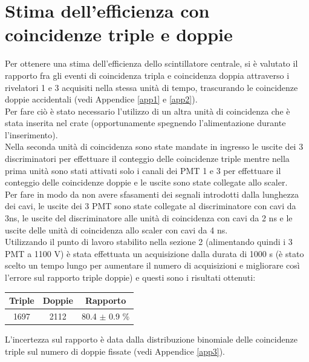 \documentclass[10pt,a4paper]{article}
\begin{document}
\section{Stima dell'efficienza con coincidenze triple e doppie}
Per ottenere una stima dell'efficienza dello scintillatore centrale, si è valutato il rapporto fra gli eventi di coincidenza tripla e coincidenza doppia attraverso i rivelatori 1 e 3 acquisiti nella stessa unità di tempo, trascurando le coincidenze doppie accidentali (vedi Appendice \ref{app1} e \ref{app2}).\\[6pt]
Per fare ciò è stato necessario l'utilizzo di un altra unità di coincidenza che è stata inserita nel crate (opportunamente spegnendo l'alimentazione durante l'inserimento).\\[6pt]
Nella seconda unità di coincidenza sono state mandate in ingresso le uscite dei 3 discriminatori per effettuare il conteggio delle coincidenze triple mentre nella prima unità sono stati attivati solo i canali dei PMT 1 e 3 per effettuare il conteggio delle coincidenze doppie e le uscite sono state collegate allo scaler.\\[6pt]
Per fare in modo da non avere sfasamenti dei segnali introdotti dalla lunghezza dei cavi, le uscite dei 3 PMT sono state collegate al discriminatore con cavi da 3ns, le uscite del discriminatore alle unità di coincidenza con cavi da 2 ns e le uscite delle unità di coincidenza allo scaler con cavi da 4 ns.\\[6pt]
Utilizzando il punto di lavoro stabilito nella sezione 2 (alimentando quindi i 3 PMT a 1100 V) è stata effettuata un acquisizione dalla durata di 1000 s (è stato scelto un tempo lungo per aumentare il numero di acquisizioni e migliorare così l'errore sul rapporto triple doppie) e questi sono i risultati ottenuti:


\begin{table}[h!]
    \centering
    \begin{tabular}{||c|c|c||}
        \hline
        \textbf{Triple}  & \textbf{Doppie} & \textbf{Rapporto} \\
        \hline
        1697 & 2112 & 80.4 $\pm$ 0.9 \% \\
        \hline
        
    \end{tabular}
\label{tab:efficienza}

\end{table}

L’incertezza sul rapporto è data dalla distribuzione binomiale delle coincidenze triple sul numero di doppie fissate (vedi Appendice \ref{app3}).
\end{document}
